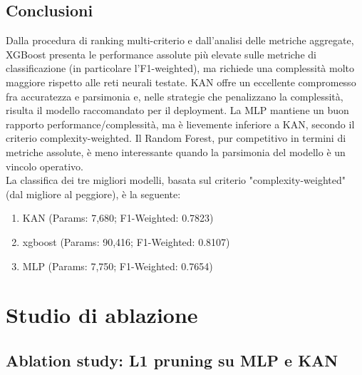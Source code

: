 \documentclass[a4paper,12pt]{report}
\begin{document}
	\subsection{Conclusioni}
	Dalla procedura di ranking multi-criterio e dall'analisi delle metriche aggregate, XGBoost presenta le performance assolute più elevate sulle metriche di classificazione (in particolare l'F1-weighted), ma richiede una complessità molto maggiore rispetto alle reti neurali testate. KAN offre un eccellente compromesso fra accuratezza e parsimonia e, nelle strategie che penalizzano la complessità, risulta il modello raccomandato per il deployment. La MLP mantiene un buon rapporto performance/complessità, ma è lievemente inferiore a KAN, secondo il criterio complexity-weighted. Il Random Forest, pur competitivo in termini di metriche assolute, è meno interessante quando la parsimonia del modello è un vincolo operativo. \\
	La classifica dei tre migliori modelli, basata sul criterio "complexity-weighted" (dal migliore al peggiore), è la seguente:
	\begin{enumerate}
		\item KAN \quad (Params: 7,680; F1-Weighted: 0.7823)
		\item xgboost \quad (Params: 90,416; F1-Weighted: 0.8107)
		\item MLP \quad (Params: 7,750; F1-Weighted: 0.7654)
	\end{enumerate}
	
	\section{Studio di ablazione}
	
	\subsection{Ablation study: L1 pruning su MLP e KAN}
	
\end{document}

